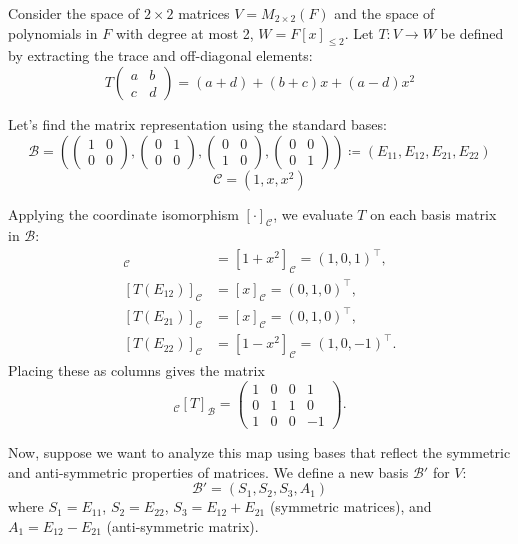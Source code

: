 \documentclass[../linear_algebra_and_groups.tex]{subfiles}
\begin{document}
\begin{example}
    Consider the space of $2 \times 2$ matrices $V = M_{2\times 2}(F)$ and the space of polynomials in $F$ with degree at most 2, $W = F[x]_{\le 2}$. Let $T: V \to W$ be defined by extracting the trace and off-diagonal elements:
    \[ T\begin{pmatrix} a & b \\ c & d \end{pmatrix} = (a+d) + (b+c)x + (a-d)x^2 \]
    
    Let's find the matrix representation using the standard bases:
    \[ \mathcal{B} = \left( \begin{pmatrix} 1 & 0 \\ 0 & 0 \end{pmatrix}, \begin{pmatrix} 0 & 1 \\ 0 & 0 \end{pmatrix}, \begin{pmatrix} 0 & 0 \\ 1 & 0 \end{pmatrix}, \begin{pmatrix} 0 & 0 \\ 0 & 1 \end{pmatrix} \right) \coloneqq (E_{11}, E_{12}, E_{21}, E_{22}) \]
    \[ \mathcal{C} = (1, x, x^2) \]
    
    Applying the coordinate isomorphism $[\cdot]_\mathcal{C}$, we evaluate $T$ on each basis matrix in $\mathcal{B}$:
    \begin{align*}
        [T(E_{11})]_\mathcal{C} &= [1 + x^2]_\mathcal{C} = (1, 0, 1)^\top, \\
        [T(E_{12})]_\mathcal{C} &= [x]_\mathcal{C} = (0, 1, 0)^\top, \\
        [T(E_{21})]_\mathcal{C} &= [x]_\mathcal{C} = (0, 1, 0)^\top,\\
        [T(E_{22})]_\mathcal{C} &= [1 - x^2]_\mathcal{C} = (1, 0, -1)^\top. 
    \end{align*}
    Placing these as columns gives the matrix
    \[ {}_\mathcal{C}[T]_\mathcal{B} = \begin{pmatrix} 1 & 0 & 0 & 1 \\ 0 & 1 & 1 & 0 \\ 1 & 0 & 0 & -1 \end{pmatrix}.\]
    
    Now, suppose we want to analyze this map using bases that reflect the symmetric and anti-symmetric properties of matrices. We define a new basis $\mathcal{B}'$ for $V$:
    \[ \mathcal{B}' = (S_1, S_2, S_3, A_1) \]
    where $S_1 = E_{11}$, $S_2 = E_{22}$, $S_3 = E_{12}+E_{21}$ (symmetric matrices), and $A_1 = E_{12}-E_{21}$ (anti-symmetric matrix). 
    

\end{example}
\end{document}
